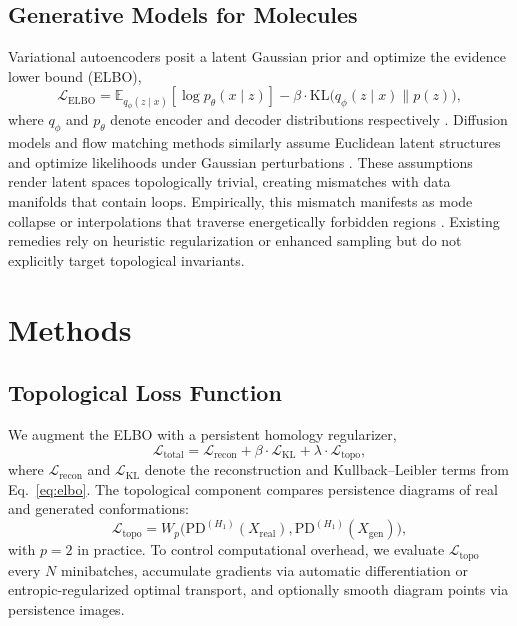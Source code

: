\documentclass[11pt]{article}
\begin{document}
\subsection{Generative Models for Molecules}
Variational autoencoders posit a latent Gaussian prior and optimize the evidence lower bound (ELBO),
\begin{equation}
    \mathcal{L}_{\text{ELBO}} = \mathbb{E}_{q_\phi(z \mid x)} [\log p_\theta(x \mid z)] - \beta \cdot \mathrm{KL}\big(q_\phi(z \mid x) \big\| p(z)\big),
    \label{eq:elbo}
\end{equation}
where $q_\phi$ and $p_\theta$ denote encoder and decoder distributions respectively \cite{kingma2014auto}. Diffusion models and flow matching methods similarly assume Euclidean latent structures and optimize likelihoods under Gaussian perturbations \cite{song2021score, lipman2023flow}. These assumptions render latent spaces topologically trivial, creating mismatches with data manifolds that contain loops. Empirically, this mismatch manifests as mode collapse or interpolations that traverse energetically forbidden regions \cite{noe2019boltzmann, trippe2023diffusion}. Existing remedies rely on heuristic regularization or enhanced sampling but do not explicitly target topological invariants.

\section{Methods}
\subsection{Topological Loss Function}
We augment the ELBO with a persistent homology regularizer,
\begin{equation}
    \mathcal{L}_{\text{total}} = \mathcal{L}_{\text{recon}} + \beta \cdot \mathcal{L}_{\text{KL}} + \lambda \cdot \mathcal{L}_{\text{topo}},
    \label{eq:total_loss}
\end{equation}
where $\mathcal{L}_{\text{recon}}$ and $\mathcal{L}_{\text{KL}}$ denote the reconstruction and Kullback--Leibler terms from Eq.~\eqref{eq:elbo}. The topological component compares persistence diagrams of real and generated conformations:
\begin{equation}
    \mathcal{L}_{\text{topo}} = W_p\big( \mathrm{PD}^{(H_1)}(X_{\text{real}}), \mathrm{PD}^{(H_1)}(X_{\text{gen}}) \big),
\end{equation}
with $p=2$ in practice. To control computational overhead, we evaluate $\mathcal{L}_{\text{topo}}$ every $N$ minibatches, accumulate gradients via automatic differentiation or entropic-regularized optimal transport, and optionally smooth diagram points via persistence images.
\end{document}
